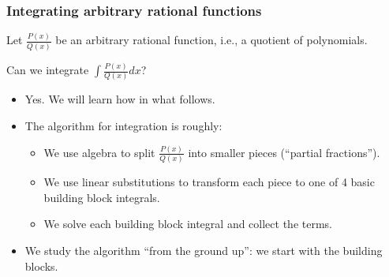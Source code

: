 \begin{frame}
\frametitle{Integrating arbitrary rational functions}
Let $\frac{P(x)}{Q(x)}$ be an arbitrary rational function, i.e., a quotient of polynomials.
\begin{question}
Can we integrate $\displaystyle\int \frac{P(x)}{Q(x)}dx$?
\end{question}
\begin{itemize}
\item<2-> Yes. We will learn how in what follows.
\item<3-> The algorithm for integration is roughly:
\begin{itemize}
\item<4-> We use algebra to split $\frac{P(x)}{Q(x)}$ into smaller pieces (``partial fractions''). 
\item<5-> We use linear substitutions to transform each piece to one of 4 basic building block integrals.
\item<6-> We solve each building block integral and collect the terms.
\end{itemize}
\item<7-> We study the algorithm ``from the ground up'': we start with the building blocks.
\end{itemize}
\end{frame}

